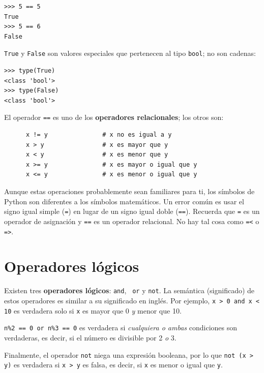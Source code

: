 \documentclass[10pt]{book}
\begin{document}
\begin{verbatim}
>>> 5 == 5
True
>>> 5 == 6
False
\end{verbatim}
%
{\tt True} y {\tt False} son valores
especiales que pertenecen al tipo {\tt bool}; no son cadenas:

\begin{verbatim}
>>> type(True)
<class 'bool'>
>>> type(False)
<class 'bool'>
\end{verbatim}
%
El operador {\tt ==} es uno de los {\bf operadores relacionales}; los
otros son:

\begin{verbatim}
      x != y               # x no es igual a y
      x > y                # x es mayor que y
      x < y                # x es menor que y
      x >= y               # x es mayor o igual que y
      x <= y               # x es menor o igual que y
\end{verbatim}
%
Aunque estas operaciones probablemente sean familiares para ti, los símbolos de Python
son diferentes a los símbolos matemáticos.  Un error común
es usar el signo igual simple ({\tt =}) en lugar de un signo igual doble
({\tt ==}).  Recuerda que {\tt =} es un operador de asignación y
{\tt ==} es un operador relacional.   No hay tal cosa como
{\tt =<} o {\tt =>}.


\section {Operadores lógicos}

Existen tres {\bf operadores lógicos}: {\tt and}, {\tt
or} y {\tt not}.  La semántica (significado) de estos operadores es
similar a su significado en inglés.  Por ejemplo,
{\tt x > 0 and x < 10} es verdadera solo si {\tt x} es mayor que 0
{\em y} menor que 10.

{\tt n\%2 == 0 or n\%3 == 0} es verdadera si {\em cualquiera o ambas}
condiciones son verdaderas, es decir, si el número es divisible por 2 {\em o}
3.

Finalmente, el operador {\tt not} niega una expresión
booleana, por lo que {\tt not (x > y)} es verdadera si {\tt x > y} es falsa,
es decir, si {\tt x} es menor o igual que {\tt y}.
\end{document}
